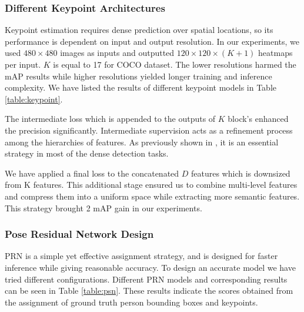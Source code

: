 \documentclass[runningheads]{llncs}
\begin{document}
\subsubsection{Different Keypoint Architectures}
Keypoint estimation requires dense prediction over spatial locations, so its performance is dependent on input and output resolution. In our experiments, we used $480 \times 480$ images as inputs and outputted $120 \times 120 \times (K+1)$ heatmaps per input. $K$ is equal to 17 for COCO dataset. The lower resolutions harmed the mAP results while higher resolutions yielded longer training and inference complexity. We have listed the results of different keypoint models in Table \ref{table:keypoint}. 


The intermediate loss which is appended to the outputs of $K$ block’s enhanced the precision significantly. Intermediate supervision acts as a refinement process among the hierarchies of features. As previously shown in \cite{Cao2016,Newella,Wei2016}, it is an essential strategy in most of the dense detection tasks.


We have applied a final loss to the concatenated $D$ features which is downsized from K features. This additional stage ensured us to combine multi-level features and compress them into a uniform space while extracting more semantic features. This strategy brought 2 mAP gain in our experiments. 
\subsubsection{Pose Residual Network Design} 
PRN is a simple yet effective assignment strategy, and is designed for faster inference while giving reasonable accuracy. To design an accurate model we have tried different configurations. Different PRN models and corresponding results can be seen in Table \ref{table:psn}. These results indicate the scores obtained from the assignment of ground truth person bounding boxes and keypoints. 
\end{document}
